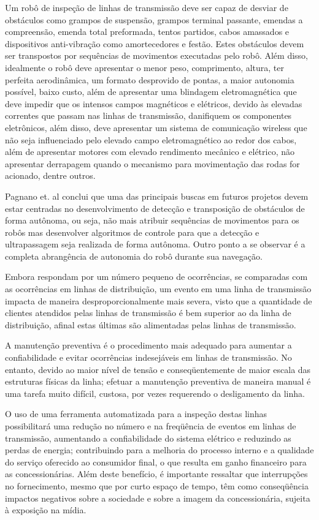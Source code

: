 Um robô de inspeção de linhas de transmissão deve ser capaz de desviar de obstáculos como grampos de suspensão, grampos terminal passante, emendas a compreensão, emenda total preformada, tentos partidos, cabos amassados e dispositivos anti-vibração como amortecedores e festão. Estes obstáculos devem ser transpostos por sequências de movimentos executadas pelo robô. Além disso, idealmente o robô deve apresentar o menor peso, comprimento, altura, ter perfeita aerodinâmica, um formato desprovido de pontas, a maior autonomia possível, baixo custo, além de apresentar uma blindagem eletromagnética que deve impedir que os intensos campos magnéticos e elétricos, devido às elevadas correntes que passam nas linhas de transmissão, danifiquem os componentes eletrônicos, além disso, deve apresentar um sistema de comunicação wireless que não seja influenciado pelo elevado campo eletromagnético ao redor dos cabos, além de apresentar motores com elevado rendimento mecânico e elétrico, não apresentar derrapagem quando o mecanismo para movimentação das rodas for acionado, dentre outros.

Pagnano et. al \cite{pag:13} conclui que uma das principais buscas em futuros projetos devem estar centradas no desenvolvimento de detecção e transposição de obstáculos de forma autônoma, ou seja, não mais atribuir sequências de movimentos para os robôs mas desenvolver algoritmos de controle para que a detecção e ultrapassagem seja realizada de forma autônoma. Outro ponto a se observar é a completa abrangência de autonomia do robô durante sua navegação. 
  
Embora respondam por um número pequeno de ocorrências, se comparadas com as ocorrências em linhas de distribuição, um evento em uma linha de transmissão impacta de maneira desproporcionalmente mais severa, visto que a quantidade de clientes atendidos pelas linhas de transmissão é bem superior ao da linha de distribuição, afinal estas últimas são alimentadas pelas linhas de transmissão.

A manutenção preventiva é o procedimento mais adequado para aumentar a confiabilidade e evitar ocorrências indesejáveis em linhas de transmissão. No entanto, devido ao maior nível de tensão e conseqüentemente de maior escala das estruturas físicas da linha; efetuar a manutenção preventiva de maneira manual é uma tarefa muito difícil, custosa, por vezes requerendo o desligamento da linha. 

O uso de uma ferramenta automatizada para a inspeção destas linhas possibilitará uma redução no número e na freqüência de eventos em linhas de transmissão, aumentando a confiabilidade do sistema elétrico e reduzindo as perdas de energia; contribuindo para a melhoria do processo interno e a qualidade do serviço oferecido ao consumidor final, o que resulta em ganho financeiro para as concessionárias. Além deste benefício, é importante ressaltar que interrupções no fornecimento, mesmo que por curto espaço de tempo, têm como conseqüência impactos negativos sobre a sociedade e sobre a imagem da concessionária, sujeita à exposição na mídia.

